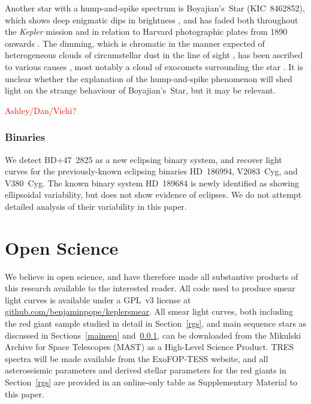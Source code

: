 \documentclass[a4paper,fleqn,usenatbib]{mnras}
\newcommand{\kepler}{\emph{Kepler}\xspace}
\begin{document}
Another star with a hump-and-spike spectrum is Boyajian's~Star (KIC~8462852), which shows deep enigmatic dips in brightness \citep{2016MNRAS.457.3988B}, and has faded both throughout the \kepler mission \citep{2016ApJ...830L..39M} and in relation to Harvard photographic plates from 1890 onwards \citep{2016ApJ...822L..34S}. The dimming, which is chromatic in the manner expected of heterogeneous clouds of circumstellar dust in the line of sight \citep{2018ApJ...853..130D,2018arXiv180608842B}, has been ascribed to various causes \citep[reviewed in][]{2018RNAAS...2a..16W}, most notably a cloud of exocomets surrounding the star \citep[e.g.][]{2018MNRAS.473.5286W}. It is unclear whether the explanation of the hump-and-spike phenomenon will shed light on the strange behaviour of Boyajian's~Star, but it may be relevant.

\textcolor{red}{Ashley/Dan/Vichi?}

\subsubsection{Binaries}
\label{ebs}

We detect BD+47~2825 as a new eclipsing binary system, and recover light curves for the previously-known eclipsing binaries HD~186994, V2083~Cyg, and V380~Cyg. The known binary system HD~189684 is newly identified as showing ellipsoidal variability, but does not show evidence of eclipses. We do not attempt detailed analysis of their variability in this paper.

\section{Open Science}
\label{open}

We believe in open science, and have therefore made all substantive products of this research available to the interested reader. All code used to produce smear light curves is available under a GPL~v3 license at \url{github.com/benjaminpope/keplersmear}. All smear light curves, both including the red giant sample studied in detail in Section~\ref{rgs}, and main sequence stars as discussed in Sections~\ref{mainseq} and~\ref{ebs}, can be downloaded from the Mikulski Archive for Space Telescopes (MAST) as a High-Level Science Product. TRES spectra will be made available from the ExoFOP-TESS website, and all asteroseismic parameters and derived stellar parameters for the red giants in Section~\ref{rgs} are provided in an online-only table as Supplementary Material to this paper.
\end{document}
